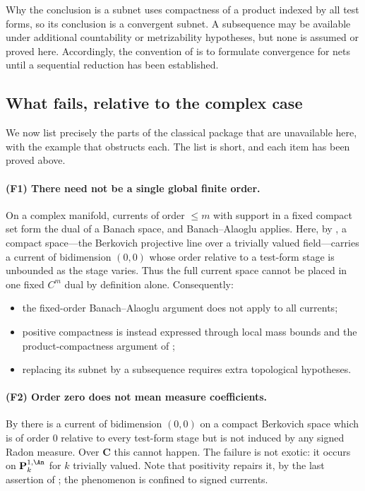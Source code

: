 \begin{warning}{Why the conclusion is a subnet}
 uses compactness of a product indexed by
all test forms, so its conclusion is a convergent subnet.  A subsequence may
be available under additional countability or metrizability hypotheses, but
none is assumed or proved here.  Accordingly, the convention of
 is to formulate convergence for nets until a
sequential reduction has been established.
\end{warning}

\subsection{What fails, relative to the complex case}
\label{sec:ch14-what-fails}

We now list precisely the parts of the classical package that are unavailable
here, with the example that obstructs each.  The list is short, and each item
has been proved above.

\paragraph{(F1) There need not be a single global finite order.}
On a complex manifold, currents of order $\le m$ with support in a fixed
compact set form the dual of a Banach space, and Banach--Alaoglu applies.
Here, by , a compact space---the Berkovich
projective line over a trivially valued field---carries a current of
bidimension $(0,0)$ whose order relative to a test-form stage is unbounded as
the stage varies.  Thus the full current space cannot be placed in one fixed
$C^m$ dual by definition alone.  Consequently:
\begin{itemize}
\item the fixed-order Banach--Alaoglu argument does not apply to all currents;
\item positive compactness is instead expressed through local mass bounds and
  the product-compactness argument of ;
\item replacing its subnet by a subsequence requires extra topological
  hypotheses.
\end{itemize}

\paragraph{(F2) Order zero does not mean measure coefficients.}
By  there is a current of bidimension $(0,0)$
on a compact Berkovich space which is of order $0$ relative to every test-form
stage but is not induced by any signed Radon measure.  Over $\mathbf C$ this
cannot happen.  The failure is not exotic: it occurs on
$\mathbf P^{1,\An}_k$ for $k$ trivially valued.  Note that positivity
repairs it, by the last assertion of
; the phenomenon is confined to signed
currents.

